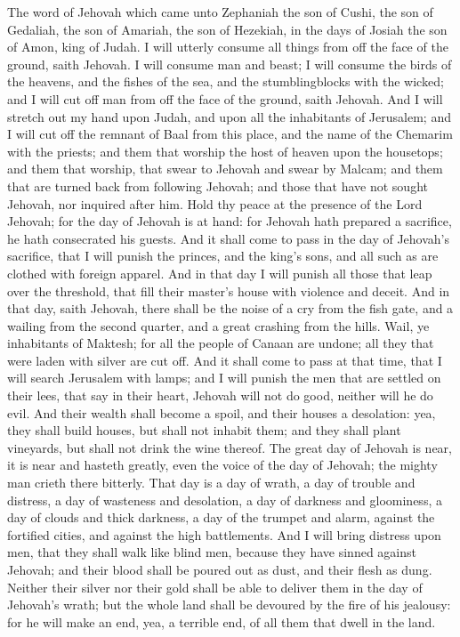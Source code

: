 


The word of Jehovah which came unto Zephaniah the son of Cushi, the son of Gedaliah, the son of Amariah, the son of Hezekiah, in the days of Josiah the son of Amon, king of Judah.  I will utterly consume all things from off the face of the ground, saith Jehovah. I will consume man and beast; I will consume the birds of the heavens, and the fishes of the sea, and the stumblingblocks with the wicked; and I will cut off man from off the face of the ground, saith Jehovah. And I will stretch out my hand upon Judah, and upon all the inhabitants of Jerusalem; and I will cut off the remnant of Baal from this place, and the name of the Chemarim with the priests; and them that worship the host of heaven upon the housetops; and them that worship, that swear to Jehovah and swear by Malcam; and them that are turned back from following Jehovah; and those that have not sought Jehovah, nor inquired after him.  Hold thy peace at the presence of the Lord Jehovah; for the day of Jehovah is at hand: for Jehovah hath prepared a sacrifice, he hath consecrated his guests. And it shall come to pass in the day of Jehovah’s sacrifice, that I will punish the princes, and the king’s sons, and all such as are clothed with foreign apparel. And in that day I will punish all those that leap over the threshold, that fill their master’s house with violence and deceit. And in that day, saith Jehovah, there shall be the noise of a cry from the fish gate, and a wailing from the second quarter, and a great crashing from the hills. Wail, ye inhabitants of Maktesh; for all the people of Canaan are undone; all they that were laden with silver are cut off. And it shall come to pass at that time, that I will search Jerusalem with lamps; and I will punish the men that are settled on their lees, that say in their heart, Jehovah will not do good, neither will he do evil. And their wealth shall become a spoil, and their houses a desolation: yea, they shall build houses, but shall not inhabit them; and they shall plant vineyards, but shall not drink the wine thereof.  The great day of Jehovah is near, it is near and hasteth greatly, even the voice of the day of Jehovah; the mighty man crieth there bitterly. That day is a day of wrath, a day of trouble and distress, a day of wasteness and desolation, a day of darkness and gloominess, a day of clouds and thick darkness, a day of the trumpet and alarm, against the fortified cities, and against the high battlements. And I will bring distress upon men, that they shall walk like blind men, because they have sinned against Jehovah; and their blood shall be poured out as dust, and their flesh as dung. Neither their silver nor their gold shall be able to deliver them in the day of Jehovah’s wrath; but the whole land shall be devoured by the fire of his jealousy: for he will make an end, yea, a terrible end, of all them that dwell in the land. 

